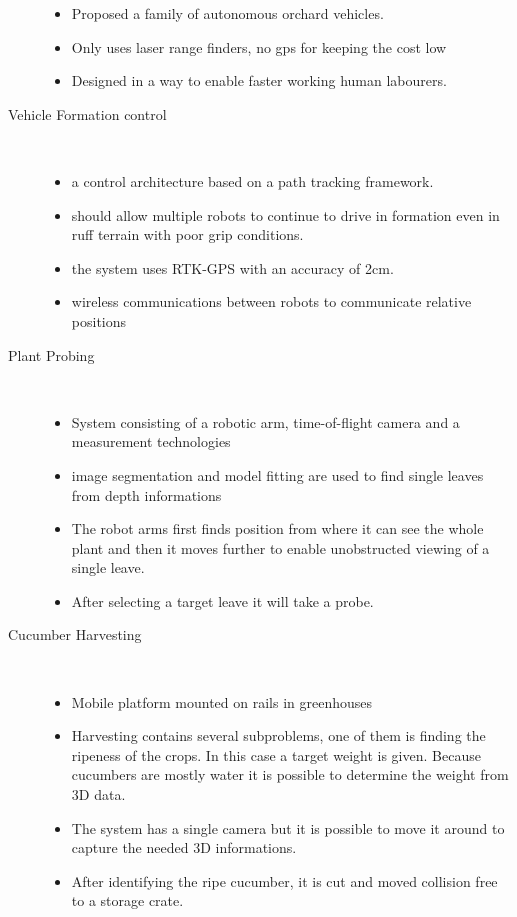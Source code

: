 \begin{description}
\begin{itemize}
            \item Proposed a family of autonomous orchard vehicles. 
            \item Only uses laser range finders, no gps for keeping the cost low
            \item Designed in a way to enable faster working human labourers.
        \end{itemize} 
        \item[Vehicle Formation control] \
        \begin{itemize}
            \item a control architecture based on a path tracking framework. 
            \item should allow multiple robots to continue to drive in formation even in ruff terrain with poor grip conditions.
            \item the system uses RTK-GPS with an accuracy of 2cm.
            \item wireless communications between robots to communicate relative positions
        \end{itemize} 
        \item[Plant Probing] \
        \begin{itemize}
            \item System consisting of a robotic arm, time-of-flight camera and a measurement technologies
            \item image segmentation and model fitting are used to find single leaves from depth informations
            \item The robot arms first finds position from where it can see the whole plant and then it moves further to enable unobstructed viewing of a single leave.
            \item After selecting a target leave it will take a probe.
        \end{itemize} 
        \item[Cucumber Harvesting] \
        \begin{itemize}
            \item Mobile platform mounted on rails in greenhouses
            \item Harvesting contains several subproblems, one of them is finding the ripeness of the crops. In this case a target weight is given. Because cucumbers are mostly water it is possible to determine the weight from 3D data.
            \item The system has a single camera but it is possible to move it around to capture the needed 3D informations.
            \item After identifying the ripe cucumber, it is cut and moved collision free to a storage crate. 
        \end{itemize} 
    
    \end{description} 
